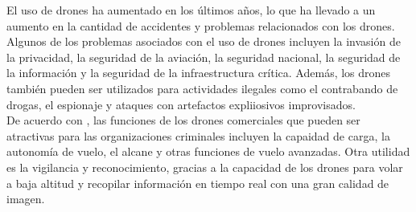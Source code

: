 \begin{justify}
    El uso de drones ha aumentado en los últimos años, lo que ha llevado a un aumento en la cantidad de accidentes y problemas relacionados con los drones.
    Algunos de los problemas asociados con el uso de drones incluyen la invasión de la privacidad, la seguridad de la aviación, la seguridad nacional,
    la seguridad de la información y la seguridad de la infraestructura crítica. Además, los drones también pueden ser utilizados para actividades ilegales
    como el contrabando de drogas, el espionaje y ataques con artefactos expliiosivos improvisados.\\

    De acuerdo con \textcite{cossio2018drones}, las funciones de los drones comerciales que pueden ser atractivas
    para las organizaciones criminales incluyen la capaidad de carga, la autonomía de vuelo, el alcane y otras funciones de vuelo avanzadas. Otra utilidad
    es la vigilancia y reconocimiento, gracias a la capacidad de los drones para volar a baja altitud y
    recopilar información en tiempo real con una gran calidad de imagen.\\
\end{justify}